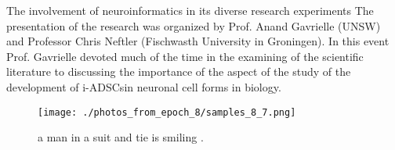 \documentclass{article}%
\begin{document}
The involvement of neuroinformatics in its diverse research experiments\newline%
The presentation of the research was organized by Prof. Anand Gavrielle (UNSW) and Professor Chris Neftler (Fischwasth University in Groningen). In this event Prof. Gavrielle devoted much of the time in the examining of the scientific literature to discussing the importance of the aspect of the study of the development of i{-}ADSCsin neuronal cell forms in biology.\newline%

%


\begin{figure}[h!]%
\centering%
\texttt{[image: ./photos\_from\_epoch\_8/samples\_8\_7.png]}%
\caption{a man in a suit and tie is smiling .}%
\end{figure}

%
\end{document}
